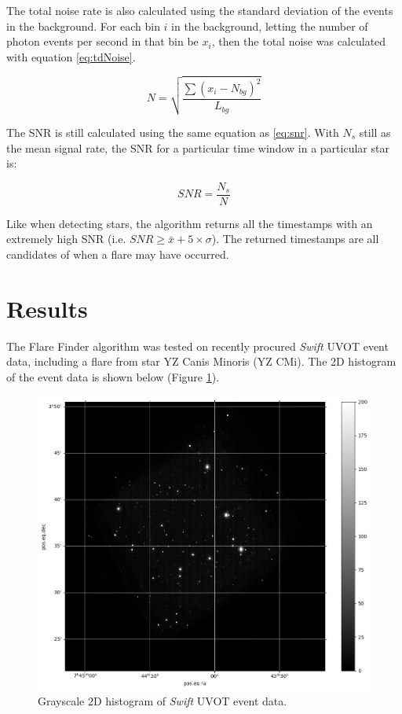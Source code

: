 \documentclass{article}
\begin{document}
\begin{multicols}{2}
The total noise rate is also calculated using the standard deviation of the events in the background. For each bin $i$ in the background, letting the number of photon events per second in that bin be $x_i$, then the total noise was calculated with equation \ref{eq:tdNoise}.

\begin{equation} \label{eq:tdNoise}
    N = \sqrt{\frac{\sum{(x_i - N_{bg})^2}}{L_{bg}}}
\end{equation}

The SNR is still calculated using the same equation as \ref{eq:snr}. With \(N_s\) still as the mean signal rate, the SNR for a particular time window in a particular star is:

\begin{equation}
    SNR = \frac{N_s}{N}
\end{equation}

Like when detecting stars, the algorithm returns all the timestamps with an extremely high SNR (i.e. \(SNR \geq \bar{x} + 5 \times \sigma\)). The returned timestamps are all candidates of when a flare may have occurred. 

\section{Results}

The Flare Finder algorithm was tested on recently procured \textit{Swift} UVOT event data, including a flare from star YZ Canis Minoris (YZ CMi). The 2D histogram of the event data is shown below (Figure \ref{img:2DHist}). 

\end{multicols}

\begin{figure}[h]
    \centering
    \includegraphics[width=\textwidth]{example2DHist.png}
    \caption{Grayscale 2D histogram of \textit{Swift} UVOT event data.}
    \label{img:2DHist}
\end{figure}
\end{document}
